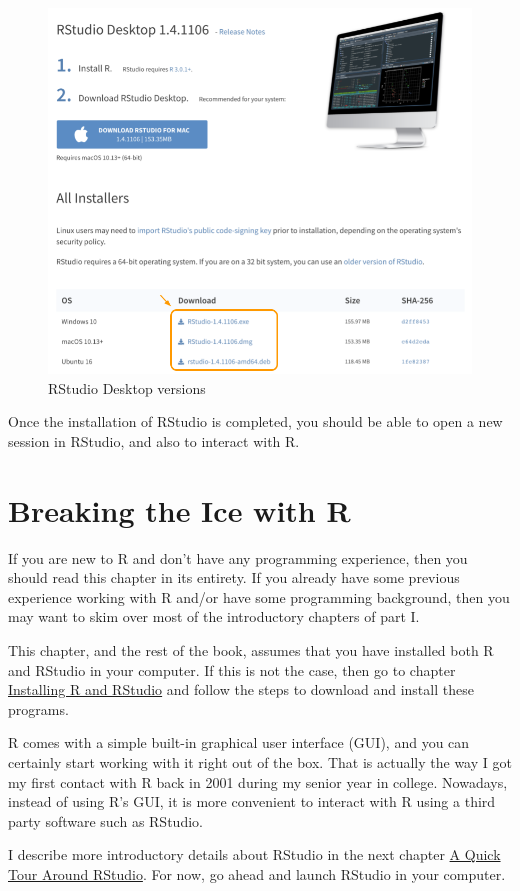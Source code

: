 \documentclass[
]{book}
\begin{document}
\begin{figure}

{\centering \includegraphics[width=0.6\linewidth]{images/install/rstudio-versions} 

}

\caption{RStudio Desktop versions}\label{fig:unnamed-chunk-12}
\end{figure}

Once the installation of RStudio is completed, you should be able to open a new
session in RStudio, and also to interact with R.

\hypertarget{rintro}{%
\chapter{Breaking the Ice with R}\label{rintro}}

If you are new to R and don't have any programming experience, then you
should read this chapter in its entirety. If you already have some previous
experience working with R and/or have some programming background, then you may
want to skim over most of the introductory chapters of part I.

This chapter, and the rest of the book, assumes that you have installed both R
and RStudio in your computer. If this is not the case, then go to chapter
\protect\hyperlink{install}{Installing R and RStudio} and follow the steps to download
and install these programs.

R comes with a simple built-in graphical user interface (GUI), and you can
certainly start working with it right out of the box. That is actually the way
I got my first contact with R back in 2001 during my senior year in college.
Nowadays, instead of using R's GUI, it is more convenient to interact with R
using a third party software such as RStudio.

I describe more introductory details about RStudio in the next chapter
\protect\hyperlink{rstudio}{A Quick Tour Around RStudio}. For now, go ahead and launch RStudio
in your computer.
\end{document}

